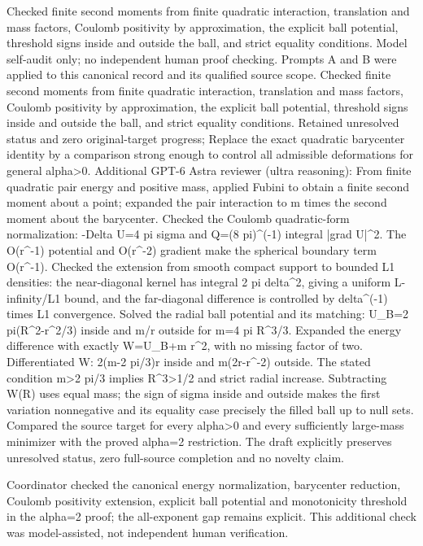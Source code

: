\documentclass[11pt]{article}
\begin{document}
Checked finite second moments from finite quadratic interaction, translation and mass factors, Coulomb positivity by approximation, the explicit ball potential, threshold signs inside and outside the ball, and strict equality conditions. Model self-audit only; no independent human proof checking. Prompts A and B were applied to this canonical record and its qualified source scope. Checked finite second moments from finite quadratic interaction, translation and mass factors, Coulomb positivity by approximation, the explicit ball potential, threshold signs inside and outside the ball, and strict equality conditions. Retained unresolved status and zero original-target progress; Replace the exact quadratic barycenter identity by a comparison strong enough to control all admissible deformations for general alpha>0. Additional GPT-6 Astra reviewer (ultra reasoning): From finite quadratic pair energy and positive mass, applied Fubini to obtain a finite second moment about a point; expanded the pair interaction to m times the second moment about the barycenter. Checked the Coulomb quadratic-form normalization: -Delta U=4 pi sigma and Q=(8 pi)\textasciicircum{}(-1) integral |grad U|\textasciicircum{}2. The O(r\textasciicircum{}-1) potential and O(r\textasciicircum{}-2) gradient make the spherical boundary term O(r\textasciicircum{}-1). Checked the extension from smooth compact support to bounded L1 densities: the near-diagonal kernel has integral 2 pi delta\textasciicircum{}2, giving a uniform L-infinity/L1 bound, and the far-diagonal difference is controlled by delta\textasciicircum{}(-1) times L1 convergence. Solved the radial ball potential and its matching: U\_B=2 pi(R\textasciicircum{}2-r\textasciicircum{}2/3) inside and m/r outside for m=4 pi R\textasciicircum{}3/3. Expanded the energy difference with exactly W=U\_B+m r\textasciicircum{}2, with no missing factor of two. Differentiated W: 2(m-2 pi/3)r inside and m(2r-r\textasciicircum{}-2) outside. The stated condition m>2 pi/3 implies R\textasciicircum{}3>1/2 and strict radial increase. Subtracting W(R) uses equal mass; the sign of sigma inside and outside makes the first variation nonnegative and its equality case precisely the filled ball up to null sets. Compared the source target for every alpha>0 and every sufficiently large-mass minimizer with the proved alpha=2 restriction. The draft explicitly preserves unresolved status, zero full-source completion and no novelty claim.

Coordinator checked the canonical energy normalization, barycenter reduction, Coulomb positivity extension, explicit ball potential and monotonicity threshold in the alpha=2 proof; the all-exponent gap remains explicit. This additional check was model-assisted, not independent human verification.
\end{document}
